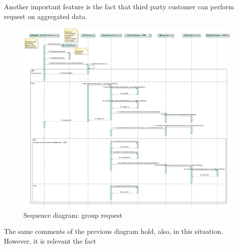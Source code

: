 \par 
Another important feature is the fact that third party customer can perform request on aggregated data.

\begin{figure}[H]
\includegraphics[width=\linewidth]{Images/grouprequest.pdf}
\caption{ Sequence diagram: group request }
\label{fig:world2}
\end{figure}

The same comments of the previous diagram hold, also, in this situation. 
However, it is relevant the fact 